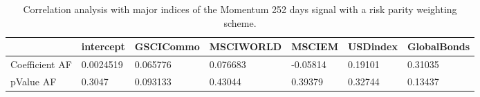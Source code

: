 \begin{table}[H]
\centering
\begin{tabular}{lllllll}
\hline& intercept & GSCICommo & MSCIWORLD & MSCIEM & USDindex & GlobalBonds \\ 
\hline 
Coefficient AF & 0.0024519 & 0.065776 & 0.076683 & -0.05814 & 0.19101 & 0.31035 \\ 
pValue AF & 0.3047 & 0.093133 & 0.43044 & 0.39379 & 0.32744 & 0.13437 \\ 
\hline
\end{tabular}
\caption{Correlation analysis with major indices of the Momentum 252 days signal with a risk parity weighting scheme.}
\label{MOM252RP_AFACTOR}
\end{table}